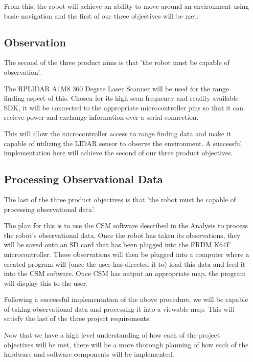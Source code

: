		From this, the robot will achieve an ability to move around an environment using basic navigation and the first of our three objectives will be met.
			
		\subsection{Observation}
		The second of the three product aims is that 'the robot must be capable of observation'.
			
		The RPLIDAR A1M8 360 Degree Laser Scanner will be used for the range finding aspect of this. Chosen for its high scan frequency and readily available SDK, it will be connected to the appropriate microcontroller pins so that it can recieve power and exchange information over a serial connection.
			
		This will allow the microcontroller access to range finding data and make it capable of utilizing the LIDAR sensor to observe the environment. A successful implementation here will achieve the second of our three product objectives.
			
		\subsection{Processing Observational Data}
		The last of the three product objectives is that 'the robot must be capable of processing observational data'.
		
		The plan for this is to use the CSM software described in the Analysis to process the robot's observational data. Once the robot has taken its observations, they will be saved onto an SD card that has been plugged into the FRDM K64F microcontroller. These observations will then be plugged into a computer where a created program will (once the user has directed it to) load this data and feed it into the CSM software. Once CSM has output an appropriate map, the program will display this to the user.
		
		Following a successful implementation of the above procedure, we will be capable of taking observational data and processing it into a viewable map. This will satisfy the last of the three project requirements.
	
	\medskip
	Now that we have a high level understanding of how each of the project objectives will be met, there will be a more thorough planning of how each of the hardware and software components will be implemented.
	
